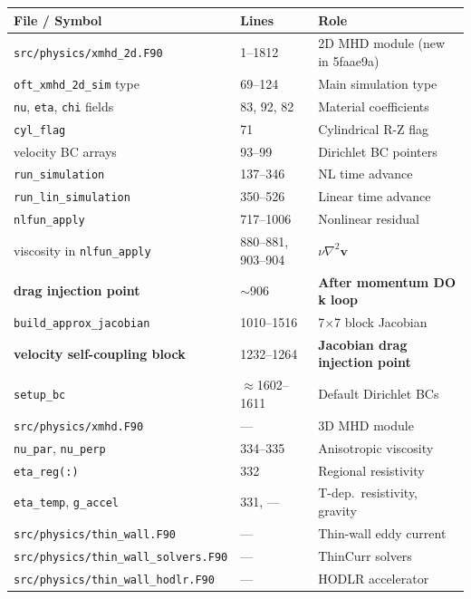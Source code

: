 \documentclass[11pt,letterpaper]{article}
\begin{document}
\begin{center}
\begin{longtable}{p{}p{}p{}}
\toprule
\textbf{File / Symbol} & \textbf{Lines} & \textbf{Role} \\
\midrule
\texttt{src/physics/xmhd\_2d.F90} & 1--1812 & 2D MHD module (new in 5faae9a) \\
\quad \texttt{oft\_xmhd\_2d\_sim} type & 69--124 & Main simulation type \\
\quad \texttt{nu}, \texttt{eta}, \texttt{chi} fields & 83, 92, 82 & Material coefficients \\
\quad \texttt{cyl\_flag} & 71 & Cylindrical R-Z flag \\
\quad velocity BC arrays & 93--99 & Dirichlet BC pointers \\
\quad \texttt{run\_simulation} & 137--346 & NL time advance \\
\quad \texttt{run\_lin\_simulation} & 350--526 & Linear time advance \\
\quad \texttt{nlfun\_apply} & 717--1006 & Nonlinear residual \\
\quad viscosity in \texttt{nlfun\_apply} & 880--881, 903--904 & $\nu\nabla^2\mathbf{v}$ \\
\quad \textbf{drag injection point} & $\sim$906 & \textbf{After momentum DO k loop} \\
\quad \texttt{build\_approx\_jacobian} & 1010--1516 & 7$\times$7 block Jacobian \\
\quad \textbf{velocity self-coupling block} & 1232--1264 & \textbf{Jacobian drag injection point} \\
\quad \texttt{setup\_bc} & $\approx$1602--1611 & Default Dirichlet BCs \\
\midrule
\texttt{src/physics/xmhd.F90} & --- & 3D MHD module \\
\quad \texttt{nu\_par}, \texttt{nu\_perp} & 334--335 & Anisotropic viscosity \\
\quad \texttt{eta\_reg(:)} & 332 & Regional resistivity \\
\quad \texttt{eta\_temp}, \texttt{g\_accel} & 331, --- & T-dep.\ resistivity, gravity \\
\midrule
\texttt{src/physics/thin\_wall.F90} & --- & Thin-wall eddy current \\
\texttt{src/physics/thin\_wall\_solvers.F90} & --- & ThinCurr solvers \\
\texttt{src/physics/thin\_wall\_hodlr.F90} & --- & HODLR accelerator \\
\midrule

\end{longtable}
\end{center}
\end{document}

